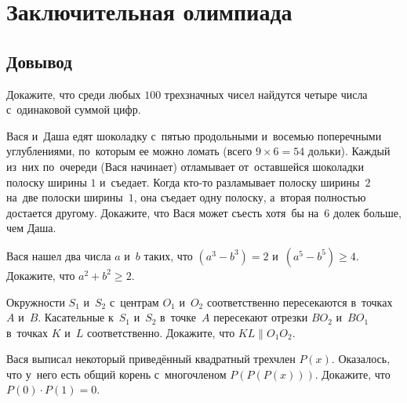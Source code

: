 
\section*{Заключительная олимпиада}


\subsection*{Довывод}

\begin{problems}

\item
Докажите, что среди любых $100$ трехзначных чисел найдутся четыре числа
с~одинаковой суммой цифр.

\item
Вася и~Даша едят шоколадку с~пятью продольными и~восемью поперечными
углублениями, по~которым ее можно ломать (всего $9 \times 6 = 54$ дольки).
Каждый из~них по~очереди (Вася начинает) отламывает от~оставшейся шоколадки
полоску ширины $1$ и~съедает.
Когда кто-то разламывает полоску ширины~$2$ на~две полоски ширины~$1$, она
съедает одну полоску, а~вторая полностью достается другому.
Докажите, что Вася может съесть хотя~бы на~$6$ долек больше, чем Даша.

\item
Вася нашел два числа $a$ и~$b$ таких, что $(a^3 - b^3) = 2$
и~$(a^5 - b^5) \geq 4$.
Докажите, что $a^2 + b^2 \geq 2$.


\item
Окружности $S_1$ и~$S_2$ с~центрам $O_1$ и~$O_2$ соответственно пересекаются
в~точках $A$ и~$B$.
Касательные к~$S_1$ и~$S_2$ в~точке~$A$ пересекают отрезки $B O_2$ и~$B O_1$
в~точках $K$ и~$L$ соответственно.
Докажите, что $KL \parallel O_1 O_2$.

\item
Вася выписал некоторый приведённый квадратный трехчлен $P(x)$.
Оказалось, что у~него есть общий корень с~многочленом $P(P(P(x)))$.
Докажите, что $P(0) \cdot P(1) = 0$.

\end{problems}



